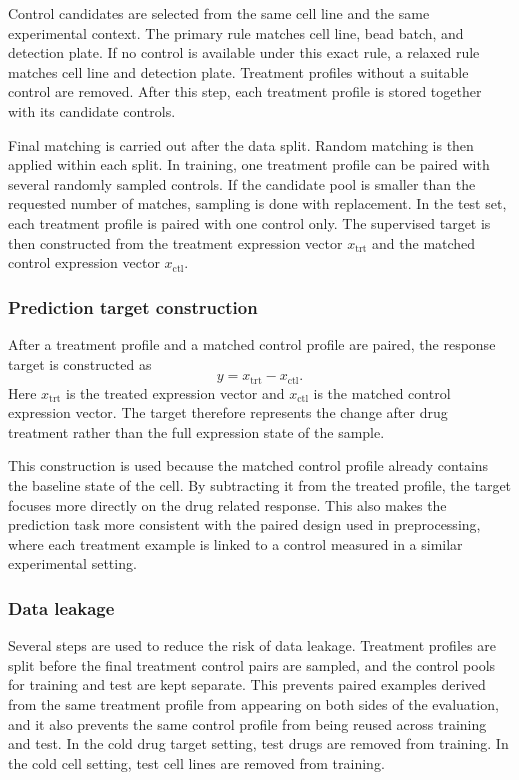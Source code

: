 \noindent Control candidates are selected from the same cell line and the same experimental context. The primary rule matches cell line, bead batch, and detection plate. If no control is available under this exact rule, a relaxed rule matches cell line and detection plate. Treatment profiles without a suitable control are removed. After this step, each treatment profile is stored together with its candidate controls.

\noindent Final matching is carried out after the data split. Random matching is then applied within each split. In training, one treatment profile can be paired with several randomly sampled controls. If the candidate pool is smaller than the requested number of matches, sampling is done with replacement. In the test set, each treatment profile is paired with one control only. The supervised target is then constructed from the treatment expression vector $x_{\mathrm{trt}}$ and the matched control expression vector $x_{\mathrm{ctl}}$.

\subsubsection{Prediction target construction}
\label{sec:prediction_target_construction}
\noindent After a treatment profile and a matched control profile are paired, the response target is constructed as
\begin{equation}
y = x_{\mathrm{trt}} - x_{\mathrm{ctl}}.
\end{equation}
\noindent Here $x_{\mathrm{trt}}$ is the treated expression vector and $x_{\mathrm{ctl}}$ is the matched control expression vector. The target therefore represents the change after drug treatment rather than the full expression state of the sample.

\noindent This construction is used because the matched control profile already contains the baseline state of the cell. By subtracting it from the treated profile, the target focuses more directly on the drug related response. This also makes the prediction task more consistent with the paired design used in preprocessing, where each treatment example is linked to a control measured in a similar experimental setting.

\subsubsection{Data leakage}
\noindent Several steps are used to reduce the risk of data leakage. Treatment profiles are split before the final treatment control pairs are sampled, and the control pools for training and test are kept separate. This prevents paired examples derived from the same treatment profile from appearing on both sides of the evaluation, and it also prevents the same control profile from being reused across training and test. In the cold drug target setting, test drugs are removed from training. In the cold cell setting, test cell lines are removed from training.

